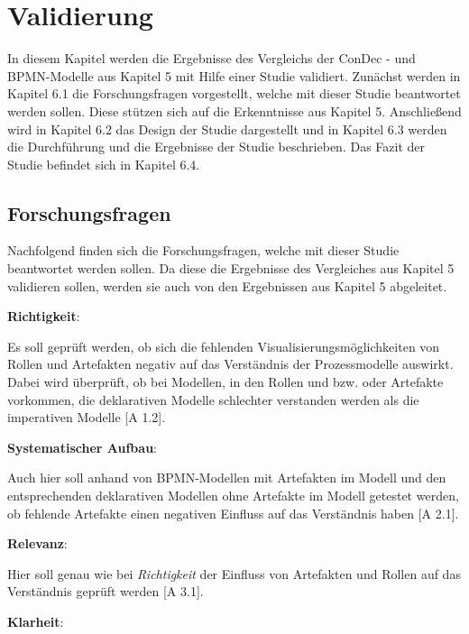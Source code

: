 \chapter{Validierung}\label{sec:chapter7}

In diesem Kapitel werden die Ergebnisse des Vergleichs der ConDec - und BPMN-Modelle aus Kapitel 5 mit Hilfe einer Studie validiert. Zunächst werden in Kapitel 6.1 die Forschungsfragen vorgestellt, welche mit dieser Studie beantwortet werden sollen. Diese stützen sich auf die Erkenntnisse aus Kapitel 5. Anschließend wird in Kapitel 6.2 das Design der Studie dargestellt und in Kapitel 6.3 werden die Durchführung und die Ergebnisse der Studie beschrieben. Das Fazit der Studie befindet sich in Kapitel 6.4. \newline


\section{Forschungsfragen}
Nachfolgend finden sich die Forschungsfragen, welche mit dieser Studie beantwortet werden sollen. Da diese die Ergebnisse des Vergleiches aus Kapitel 5 validieren sollen, werden sie auch von den Ergebnissen aus Kapitel 5 abgeleitet.\newline

\textbf{Richtigkeit}: 

Es soll geprüft werden, ob sich die fehlenden Visualisierungsmöglichkeiten von Rollen und Artefakten negativ auf das Verständnis der Prozessmodelle auswirkt. Dabei wird überprüft, ob bei Modellen, in den Rollen und bzw. oder Artefakte vorkommen, die deklarativen Modelle schlechter verstanden werden als die imperativen Modelle [A 1.2].\newline

\textbf{Systematischer Aufbau}: 

Auch hier soll anhand von BPMN-Modellen mit Artefakten im Modell und den entsprechenden deklarativen Modellen ohne Artefakte im Modell getestet werden, ob fehlende Artefakte einen negativen Einfluss auf das Verständnis haben [A 2.1].\newline

\textbf{Relevanz}: 

Hier soll genau wie bei \textit{Richtigkeit} der Einfluss von Artefakten und Rollen auf das Verständnis geprüft werden [A 3.1]. \newline

\textbf{Klarheit}: 

